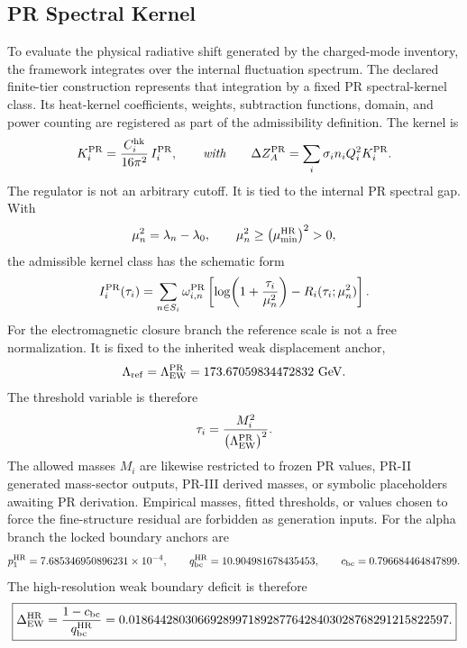 \documentclass[11pt]{article}
\begin{document}
\subsection{PR Spectral Kernel}
\label{subsec:priii-pr-spectral-kernel}
To evaluate the physical radiative shift generated by the charged-mode inventory, the framework integrates over the internal fluctuation spectrum.  The declared finite-tier construction represents that integration by a fixed PR spectral-kernel class.  Its heat-kernel coefficients, weights, subtraction functions, domain, and power counting are registered as part of the admissibility definition.  The kernel is
\begin{equation}
K_i^{\rm PR}
=
\frac{C_i^{\rm hk}}{16\pi^2}\,
I_i^{\rm PR},
\qquad
\textit{with}
\qquad
\Delta Z_A^{\rm PR}
=
\sum_i\sigma_i n_i Q_i^2 K_i^{\rm PR}.
\end{equation}
The regulator is not an arbitrary cutoff.  It is tied to the internal PR spectral gap.  With
\begin{equation}
\mu_n^2=\lambda_n-\lambda_0,
\qquad
\mu_n^2\geq \left(\mu_{\min}^{\rm HR}\right)^2>0,
\end{equation}
the admissible kernel class has the schematic form
\begin{equation}
I_i^{\rm PR}(\tau_i)
=
\sum_{n\in S_i}\omega_{i,n}^{\rm PR}
\left[
\log\!\left(1+\frac{\tau_i}{\mu_n^2}\right)
-
R_i(\tau_i;\mu_n^2)
\right].
\end{equation}
For the electromagnetic closure branch the reference scale is not a free normalization. It is fixed to the inherited weak displacement anchor,
\begin{equation}
\Lambda_{\rm ref}
=
\Lambda_{\rm EW}^{\rm PR}
=
173.67059834472832\ {\rm GeV}.
\label{eq:priii-alpha-reference-scale}
\end{equation}
The threshold variable is therefore
\begin{equation}
\tau_i
=
\frac{M_i^2}{\left(\Lambda_{\rm EW}^{\rm PR}\right)^2}.
\label{eq:priii-alpha-threshold-variable}
\end{equation}
The allowed masses \(M_i\) are likewise restricted to frozen PR values, PR-II generated mass-sector outputs, PR-III derived masses, or symbolic placeholders awaiting PR derivation. Empirical masses, fitted thresholds, or values chosen to force the fine-structure residual are forbidden as generation inputs. For the alpha branch the locked boundary anchors are
\begin{equation}
p_1^{\rm HR}=7.685346950896231\times 10^{-4},
\qquad
q_{\rm bc}^{\rm HR}=10.904981678435453,
\qquad
c_{\rm bc}=0.796684464847899.
\end{equation}
The high-resolution weak boundary deficit is therefore
\begin{equation}
\boxed{
\Delta_{\rm EW}^{\rm HR}
=
\frac{1-c_{\rm bc}}{q_{\rm bc}^{\rm HR}}
=
0.018644280306692899718928776428403028768291215822597.}
\label{eq:priii-delta-ew-hr}
\end{equation}
\end{document}
